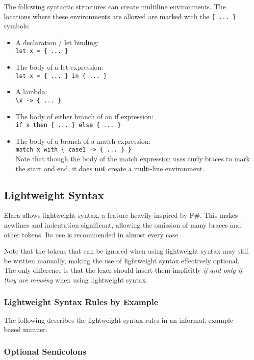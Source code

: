 \documentclass{report}
\begin{document}
The following syntactic structures can create multiline environments. The locations where these environments are allowed are marked with the \verb|{ ... }| symbols:
\begin{itemize}
    \item {A declaration / let binding: \\\verb|let x = { ... }|}
    \item {The body of a let expression: \\ \verb|let x = { ... } in { ... }|}
    \item {A lambda: \\\verb|\x -> { ... }|}
    \item {The body of either branch of an if expression:\\\verb|if x then { ... } else { ... }|}
    \item {The body of a branch of a match expression: \\\verb|match x with { case1 -> { ... } }|\\ Note that though the body of the match expression uses curly braces to mark the start and end, it does \textbf{not} create a multi-line environment.}
\end{itemize}

\subsection{Lightweight Syntax}
Elara allows lightweight syntax, a feature heavily inspired by F\#. This makes newlines and indentation significant, allowing the omission of many braces and other tokens.
Its use is recommended in almost every case.

Note that the tokens that can be ignored when using lightweight syntax may still be written manually, making the use of lightweight syntax effectively optional.
The only difference is that the lexer should insert them implicitly \emph{if and only if they are missing} when using lightweight syntax.

\subsubsection{Lightweight Syntax Rules by Example}
The following describes the lightweight syntax rules in an informal, example-based manner.

\subsubsection*{Optional Semicolons}
\end{document}
